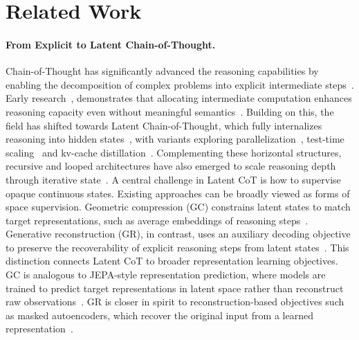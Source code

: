 \section{Related Work}
\label{sec:related}

\paragraph{From Explicit to Latent Chain-of-Thought.}
Chain-of-Thought has significantly advanced the reasoning capabilities by enabling the decomposition of complex problems into explicit intermediate steps~\citep{wei2022chain}. Early research~\citep{goyal2023think, wang2023guiding, chen-etal-2025-unveiling-key}, demonstrates that allocating intermediate computation enhances reasoning capacity even without meaningful semantics~\citep{pfau2024let, shi2025meaninglesstokensmeaningfulgains}.
Building on this, the field has shifted towards Latent Chain-of-Thought, which fully internalizes reasoning into hidden states~\citep{hao2025training, shen-etal-2025-codi}, with variants exploring parallelization~\citep{wu2025parallelcontinuouschainofthoughtjacobi}, test-time scaling~\citep{pttslatent} and kv-cache distillation~\citep{kava}. Complementing these horizontal structures, recursive and looped architectures have also emerged to scale reasoning depth through iterative state~\citep{geiping2025scaling, wang2025hierarchicalreasoningmodel, jolicoeurmartineau2025morerecursivereasoningtiny, zhu2025scalinglatentreasoninglooped}.
A central challenge in Latent CoT is how to supervise opaque continuous states.
Existing approaches can be broadly viewed as forms of space supervision.
Geometric compression (GC) constrains latent states to match target representations, such as average embeddings of reasoning steps~\citep{ccot, colar}.
Generative reconstruction (GR), in contrast, uses an auxiliary decoding objective to preserve the recoverability of explicit reasoning steps from latent states~\citep{simcot, he2025semcot}.
This distinction connects Latent CoT to broader representation learning objectives.
GC is analogous to JEPA-style representation prediction, where models are trained to predict target representations in latent space rather than reconstruct raw observations~\citep{lecun2022path}.
GR is closer in spirit to reconstruction-based objectives such as masked autoencoders, which recover the original input from a learned representation~\citep{he2022masked}.




